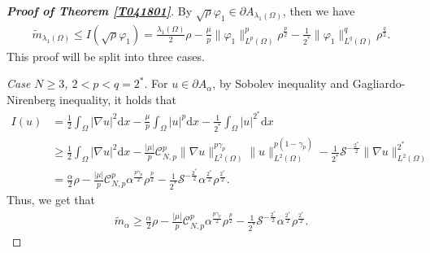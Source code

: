 \documentclass[10pt,a4paper]{amsart}
\newcommand{\ud}{\mathrm{d}}
\begin{document}
\begin{proof}[\bf Proof of Theorem \ref{T041801}]
By $\sqrt{\rho}\varphi_1 \in \partial A_{\lambda_1(\Omega)}$,  then we have
\begin{equation}\label{2505211445}
\begin{aligned}
\widetilde{m}_{\lambda_1(\Omega)}\leq I(\sqrt{\rho}\varphi_1)
=\frac{\lambda_1(\Omega)}{2}\rho
-\frac{\mu}{p}\|\varphi_1\|^p_{L^{p}(\Omega)}\rho^{\frac{p}{2}}
-\frac{1}{2^{*}}\|\varphi_1\|^{q}_{L^{q}(\Omega)}\rho^{\frac{q}{2}}.
\end{aligned}
\end{equation}
This proof will be split into three cases.
\smallskip

{\it Case $N\ge 3$, $2<p<q=2^*$}. For $u\in \partial A_{\alpha}$, by Sobolev inequality and Gagliardo-Nirenberg inequality, it holds that
\begin{equation}\label{25052719099}
\begin{aligned}
I(u)&=\frac{1}{2}\int_{\Omega}|\nabla u|^2 \ud x
-\frac{\mu}{p}\int_{\Omega}|u|^{p} \ud x
-\frac{1}{2^{*}}\int_{\Omega}|u|^{2^{*}} \ud x\\
&\geq \frac{1}{2}\int_{\Omega}|\nabla u|^2 \ud x
-\frac{|\mu|}{p}\mathcal{C}^{p}_{N,p}\|\nabla u\|^{p\gamma_{p}}_{L^{2}(\Omega)}
\|u\|^{p(1-\gamma_{p})}_{L^{2}(\Omega)}
-\frac{1}{2^{*}}\mathcal{S}^{-\frac{2^{*}}{2}}\|\nabla u\|^{2^{*}}_{L^{2}(\Omega)}\\
&=\frac{\alpha}{2}\rho
-\frac{|\mu|}{p}\mathcal{C}^{p}_{N,p}\alpha^{\frac{p\gamma_{p}}{2}}\rho^{\frac{p}{2}}
-\frac{1}{2^{*}}\mathcal{S}^{-\frac{2^{*}}{2}}\alpha^{\frac{2^{*}}{2}}\rho^{\frac{2^{*}}{2}}.
\end{aligned}
\end{equation}
Thus, we get that
\begin{equation}\label{2505211446}
\begin{aligned}
\widetilde{m}_{\alpha}\geq
\frac{\alpha}{2}\rho
-\frac{|\mu|}{p}\mathcal{C}^{p}_{N,p}\alpha^{\frac{p\gamma_{p}}{2}}\rho^{\frac{p}{2}}
-\frac{1}{2^{*}}\mathcal{S}^{-\frac{2^{*}}{2}}\alpha^{\frac{2^{*}}{2}}\rho^{\frac{2^{*}}{2}}.
\end{aligned}
\end{equation}


\end{proof}
\end{document}
